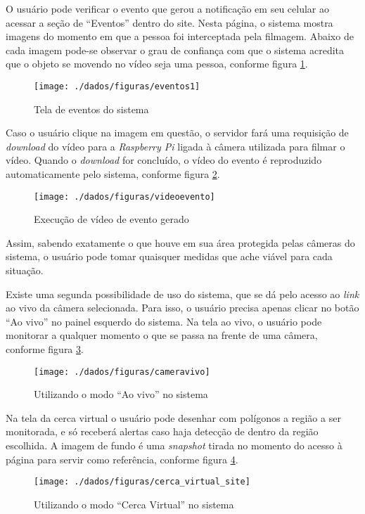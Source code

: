 O usuário pode verificar o evento que gerou a notificação em seu celular ao acessar a seção de ``Eventos'' dentro do site. Nesta página, o sistema mostra imagens do momento em que a pessoa foi interceptada pela filmagem. Abaixo de cada imagem pode-se observar o grau de confiança com que o sistema acredita que o objeto se movendo no vídeo seja uma pessoa, conforme figura \ref{fig:figura-telaeventos1}.

\begin{figure}[H]
    \centering
    \texttt{[image: ./dados/figuras/eventos1]}
    \caption{Tela de eventos do sistema}
    \label{fig:figura-telaeventos1}
\end{figure}

Caso o usuário clique na imagem em questão, o servidor fará uma requisição de \textit{download} do vídeo para a \textit{Raspberry Pi} ligada à câmera utilizada para filmar o vídeo. Quando o \textit{download} for concluído, o vídeo do evento é reproduzido automaticamente pelo sistema, conforme figura \ref{fig:figura-videoevento}.

\begin{figure}[H]
    \centering
    \texttt{[image: ./dados/figuras/videoevento]}
    \caption{Execução de vídeo de evento gerado}
    \label{fig:figura-videoevento}
\end{figure}

Assim, sabendo exatamente o que houve em sua área protegida pelas câmeras do sistema, o usuário pode tomar quaisquer medidas que ache viável para cada situação.

Existe uma segunda possibilidade de uso do sistema, que se dá pelo acesso ao \textit{link} ao vivo da câmera selecionada. Para isso, o usuário precisa apenas clicar no botão ``Ao vivo'' no painel esquerdo do sistema. Na tela ao vivo, o usuário pode monitorar a qualquer momento o que se passa na frente de uma câmera, conforme figura \ref{fig:figura-cameravivo}.

\begin{figure}[H]
    \centering
    \texttt{[image: ./dados/figuras/cameravivo]}
    \caption{Utilizando o modo ``Ao vivo'' no sistema}
    \label{fig:figura-cameravivo}
\end{figure}

Na tela da cerca virtual o usuário pode desenhar com polígonos a região a ser monitorada, e só receberá alertas caso haja detecção de dentro da região escolhida. A imagem de fundo é uma \textit{snapshot} tirada no momento do acesso à página para servir como referência, conforme figura \ref{fig:figura-cercavirtual}.

\begin{figure}[H]
    \centering
    \texttt{[image: ./dados/figuras/cerca\_virtual\_site]}
    \caption{Utilizando o modo ``Cerca Virtual'' no sistema}
    \label{fig:figura-cercavirtual}
\end{figure}
